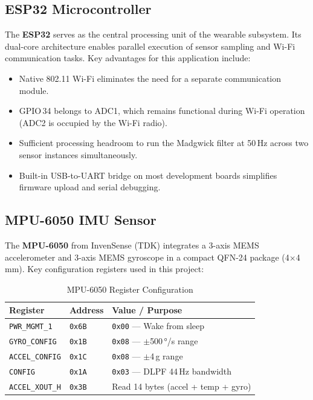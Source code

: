 \documentclass[12pt,a4paper]{report}
\newcommand{\code}[1]{\texttt{\small\color{accentviolet}#1}}
\begin{document}
\subsection{ESP32 Microcontroller}

The \textbf{ESP32} serves as the central processing unit of the wearable subsystem. Its dual-core architecture enables parallel execution of sensor sampling and Wi-Fi communication tasks. Key advantages for this application include:
\begin{itemize}[leftmargin=2em]
    \item Native 802.11 Wi-Fi eliminates the need for a separate communication module.
    \item GPIO\,34 belongs to ADC1, which remains functional during Wi-Fi operation (ADC2 is occupied by the Wi-Fi radio).
    \item Sufficient processing headroom to run the Madgwick filter at 50\,Hz across two sensor instances simultaneously.
    \item Built-in USB-to-UART bridge on most development boards simplifies firmware upload and serial debugging.
\end{itemize}

\subsection{MPU-6050 IMU Sensor}

The \textbf{MPU-6050} from InvenSense (TDK) integrates a 3-axis MEMS accelerometer and 3-axis MEMS gyroscope in a compact QFN-24 package (4$\times$4\,mm). Key configuration registers used in this project:

\begin{table}[H]
\centering
\caption{MPU-6050 Register Configuration}
\label{tab:mpu_regs}
\begin{tabular}{lll}
\toprule
\textbf{Register} & \textbf{Address} & \textbf{Value / Purpose} \\
\midrule
\code{PWR\_MGMT\_1} & \code{0x6B} & \code{0x00} — Wake from sleep \\
\code{GYRO\_CONFIG} & \code{0x1B} & \code{0x08} — $\pm$500\,°/s range \\
\code{ACCEL\_CONFIG}& \code{0x1C} & \code{0x08} — $\pm$4\,g range \\
\code{CONFIG}       & \code{0x1A} & \code{0x03} — DLPF 44\,Hz bandwidth \\
\code{ACCEL\_XOUT\_H} & \code{0x3B} & Read 14 bytes (accel + temp + gyro) \\
\bottomrule
\end{tabular}
\end{table}
\end{document}

